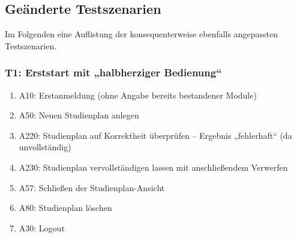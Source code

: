\newenvironment{scenario}[1]{
	\vspace{-\baselineskip}
	\subsubsection*{#1} 
	\vspace{-\baselineskip}
	\begin{enumerate}[nosep]
}{
	\end{enumerate}
}

\newenvironment{scenario*}[2]{
	\vspace{-\baselineskip}
	\subsubsection*{#1} \vspace{-\baselineskip}
	\hspace{0pt}#2  \vspace{-\baselineskip}
	\begin{enumerate}[nosep]
}{
	\end{enumerate}
}


\FloatBarrier
\subsection{Geänderte Testszenarien}

Im Folgenden eine Auflistung der konsequenterweise ebenfalls angepassten Testszenarien.

\begin{scenario}{T1: Erststart mit „halbherziger Bedienung“}
	\item A10: Erstanmeldung (ohne Angabe bereits bestandener {Module})
	\item A50: Neuen Studienplan anlegen
	\item A220: Studienplan auf Korrektheit überprüfen – Ergebnis „fehlerhaft“ (da unvollständig)
	\item A230: Studienplan vervollständigen lassen mit anschließendem Verwerfen
	\item A57: Schließen der Studienplan-Ansicht
	\item A80: Studienplan löschen 
	\item A30: Logout
\end{scenario}

